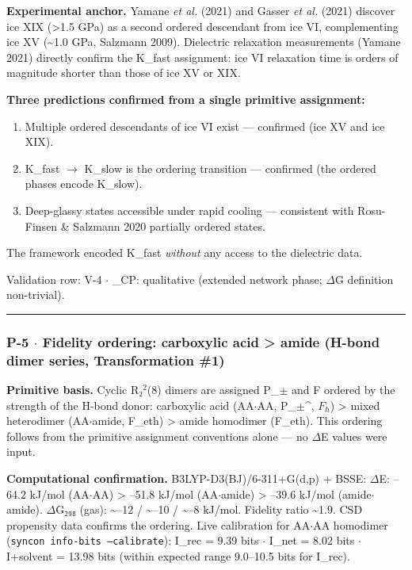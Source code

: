 \documentclass[12pt,a4paper]{article}
\begin{document}
\textbf{Experimental anchor.} Yamane \emph{et al.} (2021) and Gasser \emph{et al.} (2021) discover ice XIX (\textgreater{}1.5 GPa) as a second ordered descendant from ice VI, complementing ice XV (\textasciitilde{}1.0 GPa, Salzmann 2009). Dielectric relaxation measurements (Yamane 2021) directly confirm the K\_fast assignment: ice VI relaxation time is orders of magnitude shorter than those of ice XV or XIX.

\textbf{Three predictions confirmed from a single primitive assignment:}

\begin{enumerate}
    \item Multiple ordered descendants of ice VI exist --- confirmed (ice XV and ice XIX).
    \item K\_fast $\rightarrow$ K\_slow is the ordering transition --- confirmed (the ordered phases encode K\_slow).
    \item Deep-glassy states accessible under rapid cooling --- consistent with Rosu-Finsen \& Salzmann 2020 partially ordered states.
\end{enumerate}

The framework encoded K\_fast \emph{without} any access to the dielectric data.

Validation row: V-4 $\cdot$ \xi\_CP: qualitative (extended network phase; $\Delta$G definition non-trivial).

\begin{center}
\rule{0.5\textwidth}{0.4pt}
\end{center}

\subsubsection{P-5 $\cdot$ Fidelity ordering: carboxylic acid \textgreater{} amide (H-bond dimer series, Transformation \#1)}

\textbf{Primitive basis.} Cyclic R₂$^{2}$(8) dimers are assigned P\_$\pm$ and F ordered by the strength of the H-bond donor: carboxylic acid (AA$\cdot$AA, P\_$\pm$\^{}\psi, $F_{\hbar}$) \textgreater{} mixed heterodimer (AA$\cdot$amide, F\_eth) \textgreater{} amide homodimer (F\_eth). This ordering follows from the primitive assignment conventions alone --- no $\Delta$E values were input.

\textbf{Computational confirmation.} B3LYP-D3(BJ)/6-311+G(d,p) + BSSE:
$\Delta$E: --64.2 kJ/mol (AA$\cdot$AA) \textgreater{} --51.8 kJ/mol (AA$\cdot$amide) \textgreater{} --39.6 kJ/mol (amide$\cdot$amide).
$\Delta$G₂₉₈ (gas): \textasciitilde{}--12 / \textasciitilde{}--10 / \textasciitilde{}--8 kJ/mol. Fidelity ratio \textasciitilde{}1.9. CSD propensity data confirms the ordering. Live calibration for AA$\cdot$AA homodimer (\texttt{syncon info-bits --calibrate}): I\_rec = 9.39 bits $\cdot$ I\_net = 8.02 bits $\cdot$ I+solvent = 13.98 bits (within expected range 9.0--10.5 bits for I\_rec). 
\end{document}
